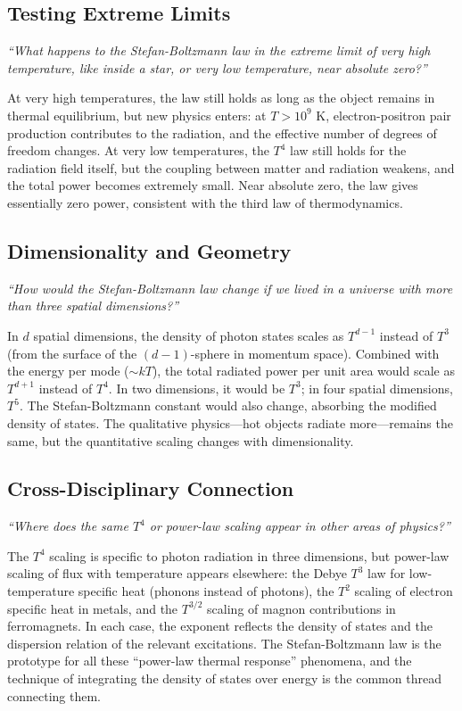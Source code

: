 \subsection*{Testing Extreme Limits}
\textit{``What happens to the Stefan-Boltzmann law in the extreme limit of very high temperature, like inside a star, or very low temperature, near absolute zero?''}

At very high temperatures, the law still holds as long as the object remains in thermal equilibrium, but new physics enters: at $T > 10^9$ K, electron-positron pair production contributes to the radiation, and the effective number of degrees of freedom changes. At very low temperatures, the $T^4$ law still holds for the radiation field itself, but the coupling between matter and radiation weakens, and the total power becomes extremely small. Near absolute zero, the law gives essentially zero power, consistent with the third law of thermodynamics.

\subsection*{Dimensionality and Geometry}
\textit{``How would the Stefan-Boltzmann law change if we lived in a universe with more than three spatial dimensions?''}

In $d$ spatial dimensions, the density of photon states scales as $T^{d-1}$ instead of $T^3$ (from the surface of the $(d-1)$-sphere in momentum space). Combined with the energy per mode ($\sim kT$), the total radiated power per unit area would scale as $T^{d+1}$ instead of $T^4$. In two dimensions, it would be $T^3$; in four spatial dimensions, $T^5$. The Stefan-Boltzmann constant would also change, absorbing the modified density of states. The qualitative physics---hot objects radiate more---remains the same, but the quantitative scaling changes with dimensionality.

\subsection*{Cross-Disciplinary Connection}
\textit{``Where does the same $T^4$ or power-law scaling appear in other areas of physics?''}

The $T^4$ scaling is specific to photon radiation in three dimensions, but power-law scaling of flux with temperature appears elsewhere: the Debye $T^3$ law for low-temperature specific heat (phonons instead of photons), the $T^2$ scaling of electron specific heat in metals, and the $T^{3/2}$ scaling of magnon contributions in ferromagnets. In each case, the exponent reflects the density of states and the dispersion relation of the relevant excitations. The Stefan-Boltzmann law is the prototype for all these ``power-law thermal response'' phenomena, and the technique of integrating the density of states over energy is the common thread connecting them.
